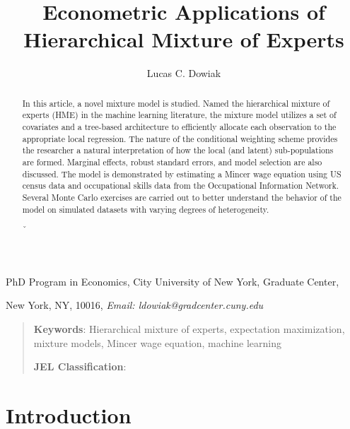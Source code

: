 \documentclass[12pt]{article}
\title{Econometric Applications of Hierarchical Mixture of Experts}
\author{Lucas C. Dowiak}
\theoremstyle{definition}
\begin{document}
 
\maketitle{}


PhD Program in Economics, City University of New York\smallskip, Graduate Center,

New York, NY, 10016, \textit{Email: ldowiak@gradcenter.cuny.edu}

\qquad

\begin{abstract}

In this article, a novel mixture model is studied. Named the hierarchical mixture of experts (HME) in the machine learning literature, the mixture model utilizes a set of covariates and a tree-based architecture to efficiently allocate each observation to the appropriate local regression. The nature of the conditional weighting scheme provides the researcher a natural interpretation of how the local (and latent) sub-populations are formed. Marginal effects, robust standard errors, and model selection are also discussed. The model is demonstrated by estimating a Mincer wage equation using US census data and occupational skills data from the Occupational Information Network. Several Monte Carlo exercises are carried out to better understand the behavior of the model on simulated datasets with varying degrees of heterogeneity.
 

ˇ\end{abstract}

\vspace{1pt}

\begin{quotation}
\textbf{Keywords}: Hierarchical mixture of experts, expectation maximization,
mixture models, Mincer wage equation, machine learning

\textbf{JEL Classification}: 
\end{quotation}

\vspace{1pt}

\section{Introduction}
\end{document}
